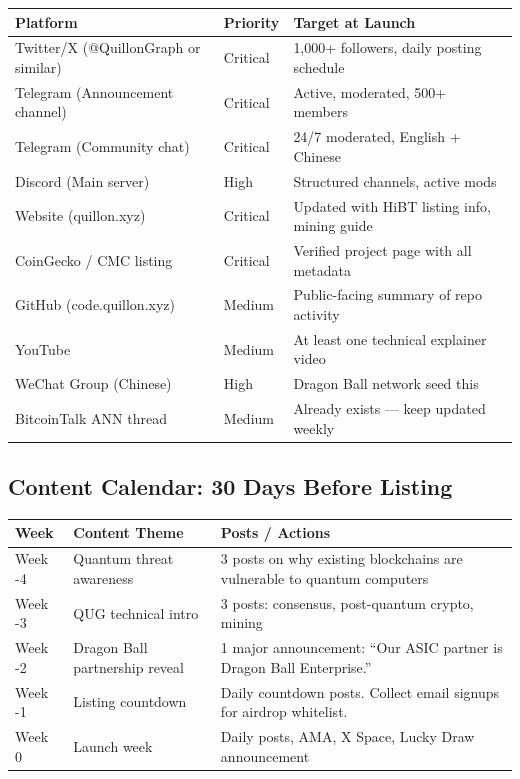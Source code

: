 \documentclass[11pt,a4paper]{article}
\begin{document}
\begin{center}
\begin{tabular}{L{5cm} C{2cm} L{6cm}}
  \toprule
  \textbf{Platform} & \textbf{Priority} & \textbf{Target at Launch} \\
  \midrule
  Twitter/X (@QuillonGraph or similar) & Critical & 1,000+ followers, daily posting schedule \\
  Telegram (Announcement channel) & Critical & Active, moderated, 500+ members \\
  Telegram (Community chat) & Critical & 24/7 moderated, English + Chinese \\
  Discord (Main server) & High & Structured channels, active mods \\
  Website (quillon.xyz) & Critical & Updated with HiBT listing info, mining guide \\
  CoinGecko / CMC listing & Critical & Verified project page with all metadata \\
  GitHub (code.quillon.xyz) & Medium & Public-facing summary of repo activity \\
  YouTube & Medium & At least one technical explainer video \\
  WeChat Group (Chinese) & High & Dragon Ball network seed this \\
  BitcoinTalk ANN thread & Medium & Already exists — keep updated weekly \\
  \bottomrule
\end{tabular}
\end{center}

\subsection{Content Calendar: 30 Days Before Listing}

\begin{center}
\begin{tabular}{C{1.5cm} L{5cm} L{6.5cm}}
  \toprule
  \textbf{Week} & \textbf{Content Theme} & \textbf{Posts / Actions} \\
  \midrule
  Week -4 & Quantum threat awareness & 3 posts on why existing blockchains are vulnerable to quantum computers \\
  Week -3 & QUG technical intro & 3 posts: consensus, post-quantum crypto, mining \\
  Week -2 & Dragon Ball partnership reveal & 1 major announcement: ``Our ASIC partner is Dragon Ball Enterprise.'' \\
  Week -1 & Listing countdown & Daily countdown posts. Collect email signups for airdrop whitelist. \\
  Week 0 & Launch week & Daily posts, AMA, X Space, Lucky Draw announcement \\
  \bottomrule
\end{tabular}
\end{center}
\end{document}
